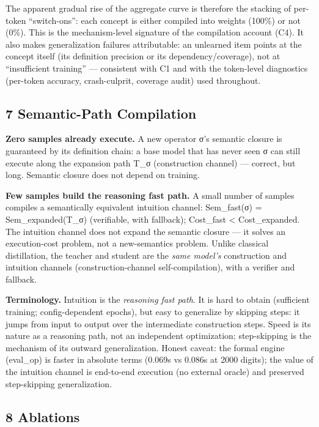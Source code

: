 \documentclass[
]{article}
\begin{document}
The apparent gradual rise of the aggregate curve is therefore the
stacking of per-token ``switch-ons'': each concept is either compiled
into weights (100\%) or not (0\%). This is the mechanism-level signature
of the compilation account (C4). It also makes generalization failures
attributable: an unlearned item points at the concept itself (its
definition precision or its dependency/coverage), not at ``insufficient
training'' --- consistent with C1 and with the token-level diagnostics
(per-token accuracy, crash-culprit, coverage audit) used throughout.

\subsection{7 Semantic-Path
Compilation}\label{semantic-path-compilation}

\textbf{Zero samples already execute.} A new operator σ's semantic
closure is guaranteed by its definition chain: a base model that has
never seen σ can still execute along the expansion path T\_σ
(construction channel) --- correct, but long. Semantic closure does not
depend on training.

\textbf{Few samples build the reasoning fast path.} A small number of
samples compiles a semantically equivalent intuition channel:
Sem\_fast(σ) = Sem\_expanded(T\_σ) (verifiable, with fallback);
Cost\_fast \textless{} Cost\_expanded. The intuition channel does not
expand the semantic closure --- it solves an execution-cost problem, not
a new-semantics problem. Unlike classical distillation, the teacher and
student are the \emph{same model's} construction and intuition channels
(construction-channel self-compilation), with a verifier and fallback.

\textbf{Terminology.} Intuition is the \emph{reasoning fast path}. It is
hard to obtain (sufficient training; config-dependent epochs), but easy
to generalize by skipping steps: it jumps from input to output over the
intermediate construction steps. Speed is its nature as a reasoning
path, not an independent optimization; step-skipping is the mechanism of
its outward generalization. Honest caveat: the formal engine (eval\_op)
is faster in absolute terms (0.069s vs 0.086s at 2000 digits); the value
of the intuition channel is end-to-end execution (no external oracle)
and preserved step-skipping generalization.

\subsection{8 Ablations}\label{ablations}
\end{document}

